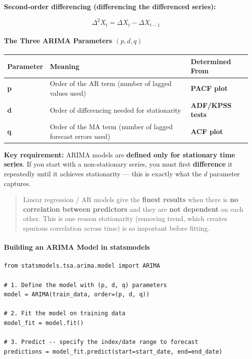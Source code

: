 \documentclass[12pt,openany]{book}
\begin{document}
\textbf{Second-order differencing (differencing the differenced series):}

\begin{equation*}
    \Delta^2 X_t = \Delta X_t - \Delta X_{t-1}
\end{equation*}

\paragraph{The Three ARIMA Parameters \((p, d, q)\)}

\begin{center}
\begin{tabular}{|L{0.22\textwidth}|L{0.32\textwidth}|L{0.32\textwidth}|}
\hline
Parameter & Meaning & Determined From \\
\hline
\textbf{p} & Order of the AR term (number of lagged values used) & \textbf{PACF plot} \\
\hline
\textbf{d} & Order of differencing needed for stationarity & \textbf{ADF/KPSS tests} \\
\hline
\textbf{q} & Order of the MA term (number of lagged forecast errors used) & \textbf{ACF plot} \\
\hline
\end{tabular}
\end{center}

\textbf{Key requirement:} ARIMA models are \textbf{defined only for stationary time series}. If you start with a non-stationary series, you must first \textbf{difference} it repeatedly until it achieves stationarity --- this is exactly what the \(d\) parameter captures.

\begin{quote}
Linear regression / AR models give the \textbf{finest results} when there is \textbf{no correlation between predictors} and they are \textbf{not dependent} on each other. This is one reason stationarity (removing trend, which creates spurious correlation across time) is so important before fitting.\par

\end{quote}

\paragraph{Building an ARIMA Model in statsmodels}

\begin{Verbatim}[breaklines=true,breakanywhere=true,fontsize=\small]
from statsmodels.tsa.arima.model import ARIMA

# 1. Define the model with (p, d, q) parameters
model = ARIMA(train_data, order=(p, d, q))

# 2. Fit the model on training data
model_fit = model.fit()

# 3. Predict -- specify the index/date range to forecast
predictions = model_fit.predict(start=start_date, end=end_date)
\end{Verbatim}
\end{document}
